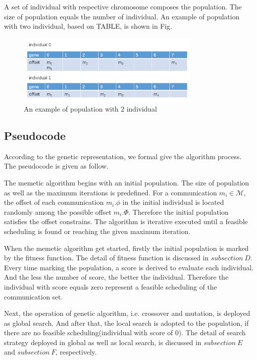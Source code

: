\documentclass[conference]{IEEEtran}
\begin{document}
A set of individual with respective chromosome composes the population. The size of population equals the number of individual. An example of population with two individual, based on TABLE, is shown in Fig.

\begin{figure}[!t]
	\centering
	\includegraphics[width=3.5in]{picture/2individual}
	\caption{An example of population with 2 individual}
	\label{individual fig}
\end{figure}

\subsection{Pseudocode}

According to the genetic representation, we formal give the algorithm process. The pseudocode is given as follow.

The memetic algorithm begins with an initial population. The size of population as well as the maximum iterations is predefined. For a communication $m_{i}\in\mathcal{M}$, the offset of each communication $m_{i}.\phi$ in the initial individual is located randomly among the possible offset $m_{i}.\Phi$. Therefore the initial population satisfies the offset constrains. The algorithm is iterative executed until a feasible scheduling is found or reaching the given maximum iteration.

When the memetic algorithm get started, firstly the initial population is marked by the fitness function. The detail of fitness function is discussed in $subsection\ D$. Every time marking the population, a score is derived to evaluate each individual. And the less the number of score, the better the individual. Therefore the individual with score equals zero represent a feasible scheduling of the communication set.

Next, the operation of genetic algorithm, i.e. crossover and mutation, is deployed as global search. And after that, the local search is adopted to the population, if there are no feasible scheduling(individual with score of 0). The detail of search strategy deployed in global as well as local search, is discussed in $subsection\ E$ and $subsection\ F$, respectively.
\end{document}
